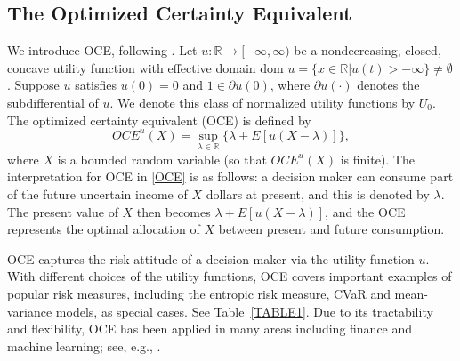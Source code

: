 \documentclass[11pt]{article}
\newcommand{\1}{\mathbbm{1}}
\begin{document}
\subsection{The Optimized Certainty Equivalent}\label{SEC22}
We introduce OCE, following \cite{ben2007old}. 
Let $u : \mathbb{R}\rightarrow [-\infty,\infty)$ be a nondecreasing, closed, concave utility function with effective domain dom $u=\{x\in\mathbb{R}\vert u(t)>-\infty\}\neq \emptyset$. Suppose $u$ satisfies $u(0)=0$ and $1\in \partial u(0)$, where $\partial u(\cdot)$ denotes the subdifferential of $u$. 
We denote this class of normalized utility functions by $U_0$. 
The optimized certainty equivalent (OCE) %
is defined by 
\begin{equation}\label{OCE}
OCE^u(X)=\sup_{\lambda\in \mathbb{R}}\{\lambda+E[u(X-\lambda)]\},
\end{equation}
where $X$ is a bounded random variable (so that $OCE^u(X)$ is finite). The interpretation for OCE in \eqref{OCE} is as follows: a decision maker can consume part of the future uncertain income of $X$ dollars at present, and this is denoted by $\lambda$. The present value of $X$ then becomes $\lambda+E[u(X-\lambda)]$, and the OCE represents the optimal allocation of $X$ between present and future consumption. 



OCE captures the risk attitude of a decision maker via the utility function $u$. With different choices of the utility functions, OCE covers important examples of popular risk measures, including the entropic risk measure, CVaR and mean-variance models, as special cases. See Table~\ref{TABLE1}.
Due to its tractability and flexibility, OCE has been applied in many areas including finance and machine learning; see, e.g., \cite{ben2007old, lee2020learning, la2022wasserstein}. 
\end{document}
